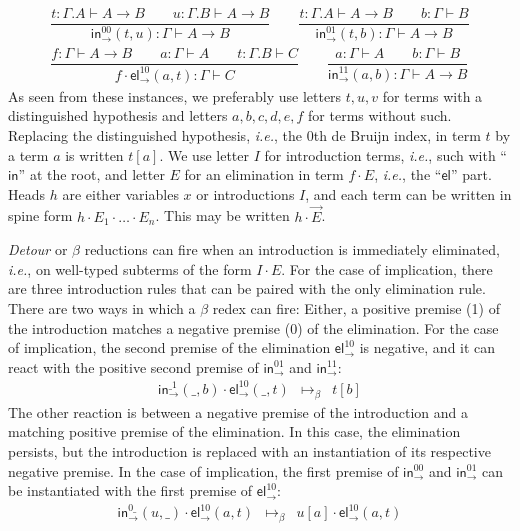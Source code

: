 \documentclass[a4paper,USenglish,cleveref, autoref, thm-restate]{lipics-v2019}
\newcommand{\ie}{\emph{i.e.}\xspace}
\newcommand{\ru}{\dfrac}
\newcommand{\tin}{\ensuremath{\mathsf{in}}}
\newcommand{\inn}[2]{\ensuremath{\tin_{#1}^{#2}}}
\newcommand{\tel}{\mathsf{el}}
\newcommand{\el}[2]{\ensuremath{\tel_{#1}^{#2}}}
\newcommand{\contract}[1][]{\mapsto_{#1}}
\begin{document}
%
\begin{gather*}
  \ru{t : \Gamma.A \vdash A \to B \qquad
      u : \Gamma.B \vdash A \to B
    }{\inn\to{00}(t,u) : \Gamma \vdash A \to B
    }
\qquad
  \ru{t : \Gamma.A \vdash A \to B \qquad
      b : \Gamma \vdash B
    }{\inn\to{01}(t,b) : \Gamma \vdash A \to B
    }
\\[2ex]
  \ru{f : \Gamma \vdash A \to B \qquad
      a : \Gamma \vdash A \qquad
      t : \Gamma.B \vdash C
    }{f \cdot \el\to{10}(a,t) : \Gamma \vdash C
    }
\qquad
  \ru{a : \Gamma \vdash A \qquad
      b : \Gamma \vdash B
    }{\inn\to{11}(a,b) : \Gamma \vdash A \to B
    }
\end{gather*}
As seen from these instances,
we preferably use letters $t,u,v$ for terms with a distinguished
hypothesis
and letters $a,b,c,d,e,f$ for terms without such.
Replacing the distinguished hypothesis, \ie,
the 0th de Bruijn index,
in term $t$ by a term $a$
is written $t[a]$.  We use letter $I$ for introduction terms, \ie,
such with ``$\tin$'' at the root,
and letter $E$ for an elimination in term $f \cdot E$,
\ie, the ``$\tel$'' part.  Heads $h$ are either variables $x$ or
introductions $I$, and each term can be written in spine form $h \cdot
E_1 \cdot \dots \cdot E_n$.  This may be written $h \cdot \vec E$.

\emph{Detour} or $\beta$ reductions can fire when an introduction is
immediately eliminated, \ie, on well-typed subterms of the form $I
\cdot E$.  For the case of implication, there are three
introduction rules that can be paired with the only elimination rule.
There are two ways in which a $\beta$ redex can fire:  Either, a
positive premise (1) of the introduction matches a negative premise
(0) of the elimination.  For the case of implication, the second
premise of the elimination $\el\to{10}$
is negative, and it can react with the
positive second premise of $\inn\to{01}$ and $\inn\to{11}$:
\[
\begin{array}{lll}
  \inn\to{\_1}(\_,b) \cdot \el\to{10}(\_,t)
    & \contract[\beta] &
  t[b]
\end{array}
\]
The other reaction is between a negative premise of the introduction
and a matching positive premise of the elimination.  In this case, the
elimination persists, but the introduction is replaced with an
instantiation of its respective negative premise.  In the case of
implication, the first premise of $\inn\to{00}$ and $\inn\to{01}$ can
be instantiated with the first premise of $\el\to{10}$:
\[
\begin{array}{lll}
  \inn\to{0\_}(u,\_) \cdot \el\to{10}(a,t)
    & \contract[\beta] &
  u[a] \cdot \el\to{10}(a,t)
\\
\end{array}
\]
\end{document}
